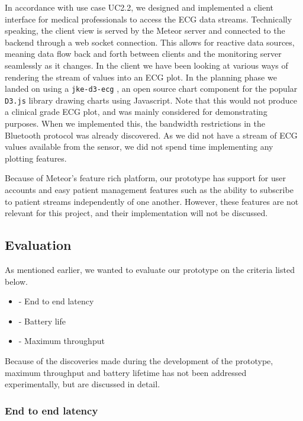 In accordance with use case \textsc{UC2.2}, we designed and implemented a client interface for medical professionals to access the ECG data streams. Technically speaking, the client view is served by the Meteor server and connected to the backend through a web socket connection. This allows for reactive data sources, meaning data flow back and forth between clients and the monitoring server seamlessly as it changes. In the client we have been looking at various ways of rendering the stream of values into an ECG plot. In the planning phase we landed on using a \texttt{jke-d3-ecg} \cite{jke_d3}, an open source chart component for the popular \texttt{D3.js} library drawing charts using Javascript. Note that this would not produce a clinical grade ECG plot, and was mainly considered for demonstrating purposes. When we implemented this, the bandwidth restrictions in the Bluetooth protocol was already discovered. As we did not have a stream of ECG values available from the sensor, we did not spend time implementing any plotting features. 

Because of Meteor's feature rich platform, our prototype has support for user accounts and easy patient management features such as the ability to subscribe to patient streams independently of one another. However, these features are not relevant for this project, and their implementation will not be discussed.


\subsection{Evaluation} %
\label{sub:evaluation}

As mentioned earlier, we wanted to evaluate our prototype on the criteria listed below.

\begin{itemize}
	\item - End to end latency
	\item - Battery life
	\item - Maximum throughput
\end{itemize}

Because of the discoveries made during the development of the prototype, maximum throughput and battery lifetime has not been addressed experimentally, but are discussed in detail.

\subsubsection{End to end latency} %
\label{ssub:end_to_end_latency}

